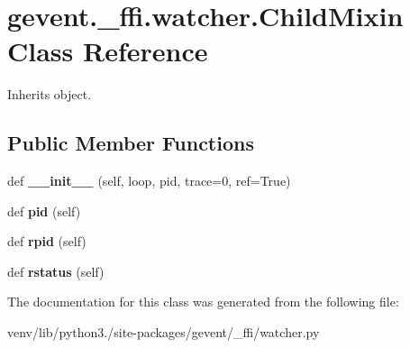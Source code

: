 \hypertarget{classgevent_1_1__ffi_1_1watcher_1_1_child_mixin}{}\section{gevent.\+\_\+ffi.\+watcher.\+Child\+Mixin Class Reference}
\label{classgevent_1_1__ffi_1_1watcher_1_1_child_mixin}


Inherits object.

\subsection*{Public Member Functions}
\begin{DoxyCompactItemize}
\item 
\mbox{\label{classgevent_1_1__ffi_1_1watcher_1_1_child_mixin_acba81000612ac1653e2bb6337e558779}} 
def {\bfseries \+\_\+\+\_\+init\+\_\+\+\_\+} (self, loop, pid, trace=0, ref=True)
\item 
\mbox{\label{classgevent_1_1__ffi_1_1watcher_1_1_child_mixin_a1d03dda582312b81d0186539093e5d63}} 
def {\bfseries pid} (self)
\item 
\mbox{\label{classgevent_1_1__ffi_1_1watcher_1_1_child_mixin_af3bda865b5f5a0454d448cc64ae2537e}} 
def {\bfseries rpid} (self)
\item 
\mbox{\label{classgevent_1_1__ffi_1_1watcher_1_1_child_mixin_a7d1cdab840b915b01584477f5c32decf}} 
def {\bfseries rstatus} (self)
\end{DoxyCompactItemize}


The documentation for this class was generated from the following file\+:\begin{DoxyCompactItemize}
\item 
venv/lib/python3./site-\/packages/gevent/\+\_\+ffi/watcher.\+py\end{DoxyCompactItemize}
